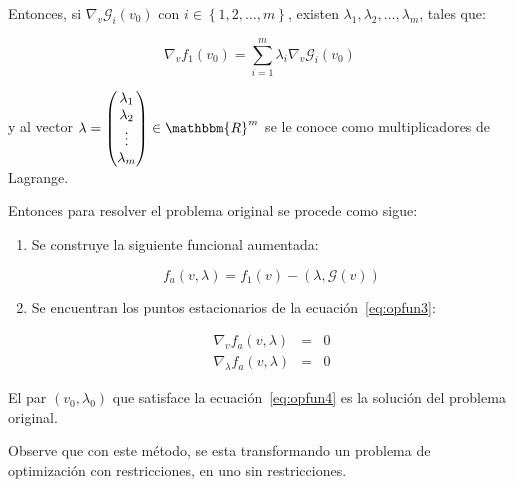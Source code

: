         Entonces, si $\nabla_v \mathscr{G}_i(v_0)$ con $i \in \left\{ 1, 2, \dots, m \right\}$, existen $\lambda_1, \lambda_2, \dots, \lambda_m$, tales que:

        \begin{equation}
            \nabla_v f_1(v_0) = \sum_{i=1}^m \lambda_i \nabla_v \mathscr{G}_i(v_0)
        \end{equation}

        y al vector $\lambda = \begin{pmatrix} \lambda_1 \\ \lambda_2 \\ \vdots \\ \lambda_m \end{pmatrix} \in \mathbbm{R}^m$ se le conoce como multiplicadores de Lagrange.

        Entonces para resolver el problema original se procede como sigue:

        \begin{enumerate}
            \item Se construye la siguiente funcional aumentada:

            \begin{equation}\label{eq:opfun3}
                f_a(v, \lambda) = f_1(v) - \left( \lambda, \mathscr{G}(v) \right)
            \end{equation}

            \item Se encuentran los puntos estacionarios de la ecuación~\ref{eq:opfun3}:

            \begin{eqnarray}\label{eq:opfun4}
                \nabla_v f_a(v, \lambda) & = & 0 \nonumber \\
                \nabla_\lambda f_a(v, \lambda) & = & 0
            \end{eqnarray}
        \end{enumerate}

        El par $(v_0, \lambda_0)$ que satisface la ecuación~\ref{eq:opfun4} es la solución del problema original.

        Observe que con este método, se esta transformando un problema de optimización con restricciones, en uno sin restricciones.
